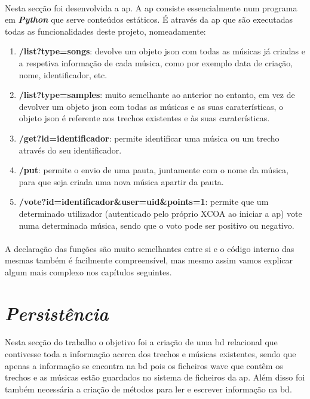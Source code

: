 \documentclass[a4paper]{report}
\begin{document}
\paragraph{}Nesta secção foi desenvolvida a \ac{ap}. A \ac{ap} consiste essencialmente num programa em \textit{\textbf{Python}} que serve conteúdos estáticos. É através da \ac{ap} que são executadas todas as funcionalidades deste projeto, nomeadamente:
\begin{enumerate}
   \item \textbf{/list?type=songs}: devolve um objeto \ac{json} com todas as músicas já criadas e a respetiva informação de cada música, como por exemplo data de criação, nome, identificador, etc. 
   \item \textbf{/list?type=samples}: muito semelhante ao anterior no entanto, em vez de devolver um objeto \ac{json} com todas as músicas e as suas caraterísticas, o objeto \ac{json} é referente aos trechos existentes e às suas caraterísticas.
   \item \textbf{/get?id=identificador}: permite identificar uma música ou um trecho através do seu identificador.
   \item \textbf{/put}: permite o envio de uma pauta, juntamente com o nome da música, para que seja criada uma nova música apartir da pauta.
   \item \textbf{/vote?id=identificador\&user=uid\&points=1}: permite que um determinado utilizador (autenticado pelo próprio XCOA ao iniciar a \ac{ap}) vote numa determinada música, sendo que o voto pode ser positivo ou negativo.
\end{enumerate}

\paragraph{}A declaração das funções são muito semelhantes entre si e o código interno\cite{guiao} das mesmas também é facilmente compreensível, mas mesmo assim vamos explicar algum mais complexo nos capítulos seguintes.

\newpage

\section{\textit{Persistência}}

\paragraph{}Nesta secção do trabalho o objetivo foi a criação de uma \ac{bd} relacional que contivesse toda a informação acerca dos trechos e músicas existentes, sendo que apenas a informação se encontra na \ac{bd} pois os ficheiros \ac{wave} que contêm os trechos e as músicas estão guardados no sistema de ficheiros da \ac{ap}. Além disso foi também necessária a criação de métodos para ler e escrever informação na \ac{bd}.
\end{document}
